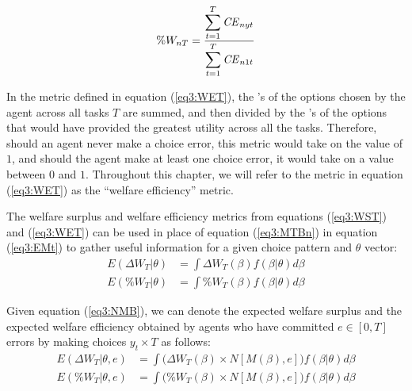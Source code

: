 \documentclass[../main.tex]{subfiles}
\begin{document}
\begin{equation}
	\label{eq3:WET}
	\%W_{nT} = \frac{\displaystyle\sum_{t=1}^{T} {\mathit{CE}}_{nyt} }{\displaystyle\sum_{t=1}^{T} {\mathit{CE}}_{n1t}}
\end{equation}

\noindent In the metric defined in equation (\ref{eq3:WET}), the {\CE}'s of the options chosen by the agent across all tasks $T$ are summed, and then divided by the {\CE}'s of the options that would have provided the greatest utility across all the tasks.
Therefore, should an agent never make a choice error, this metric would take on the value of $1$, and should the agent make at least one choice error, it would take on a value between $0$ and $1$.{\footnotemark}
Throughout this chapter, we will refer to the metric in equation (\ref{eq3:WET}) as the \enquote{welfare efficiency} metric.

\addtocounter{footnote}{-1}

The welfare surplus and welfare efficiency metrics from equations (\ref{eq3:WST}) and (\ref{eq3:WET}) can be used in place of equation (\ref{eq3:MTBn}) in equation (\ref{eq3:EMt}) to gather useful information for a given choice pattern and $\theta$ vector:
\begin{align}
	E( \Delta W_T | \theta) &= \int \Delta W_T(\beta) f(\beta | \theta) d \beta \label{eq3:EWST}\\
	E( \% W_T | \theta) &= \int \% W_T(\beta) f(\beta | \theta) d \beta \label{eq3:EWET}
\end{align}

Given equation (\ref{eq3:NMB}), we can denote the expected welfare surplus and the expected welfare efficiency obtained by agents who have committed $e \in [0,T]$ errors by making choices $y_t \times T$ as follows:
\begin{align}
	E( \Delta W_T | \theta, e) &= \int \bigr( \Delta W_T(\beta) \times N[M(\beta),e] \bigr) f(\beta | \theta) d \beta \label{eq3:EDWTe}\\
	E( \% W_T | \theta, e) &= \int \bigl( \% W_T(\beta) \times N[M(\beta),e] \bigr) f(\beta | \theta) d \beta \label{eq3:EPWTe}
\end{align}
\end{document}
